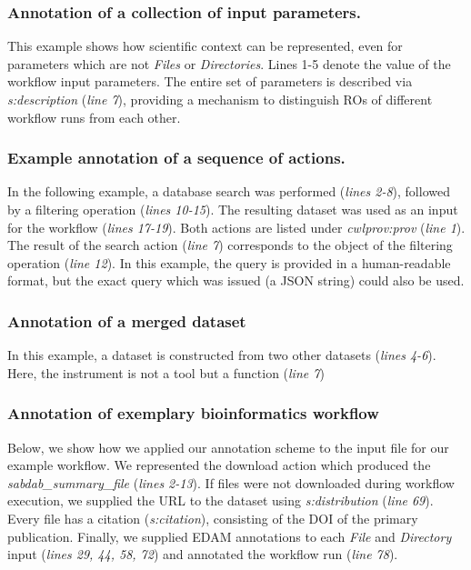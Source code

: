 

\subsubsection{Annotation of a collection of input parameters.} \label{sec:renske:annot_actions}
This example shows how scientific context can be represented, even for parameters which are not \emph{Files} or \emph{Directories}. Lines 1-5 denote the value of the workflow input parameters. The entire set of parameters is described via \emph{s:description} (\emph{line 7}), providing a mechanism to distinguish ROs of different workflow runs from each other.



\subsubsection{Example annotation of a sequence of actions.} 

In the following example, a database search was performed (\emph{lines 2-8}), followed by a filtering operation (\emph{lines 10-15}). The resulting dataset was used as an input for the workflow (\emph{lines 17-19}). Both actions are listed under \emph{cwlprov:prov} (\emph{line 1}). The result of the search action (\emph{line 7}) corresponds to the object of the filtering operation (\emph{line 12}). In this example, the query is provided in a human-readable format, but the exact query which was issued (a JSON string) could also be used.



\subsubsection{Annotation of a merged dataset}

In this example, a dataset is constructed from two other datasets (\emph{lines 4-6}).
Here, the instrument is not a tool but a function (\emph{line 7})



\subsubsection{Annotation of exemplary bioinformatics workflow}
Below, we show how we applied our annotation scheme to the input file for our example workflow. We represented the download action which produced the \emph{sabdab\_summary\_file} (\emph{lines 2-13}). If files were not downloaded during workflow execution, we supplied the URL to the dataset using \emph{s:distribution} (\emph{line 69}). Every file has a citation (\emph{s:citation}), consisting of the DOI of the primary publication. Finally, we supplied EDAM annotations to each \emph{File} and \emph{Directory} input (\emph{lines 29, 44, 58, 72}) and annotated the workflow run (\emph{line 78}). 

